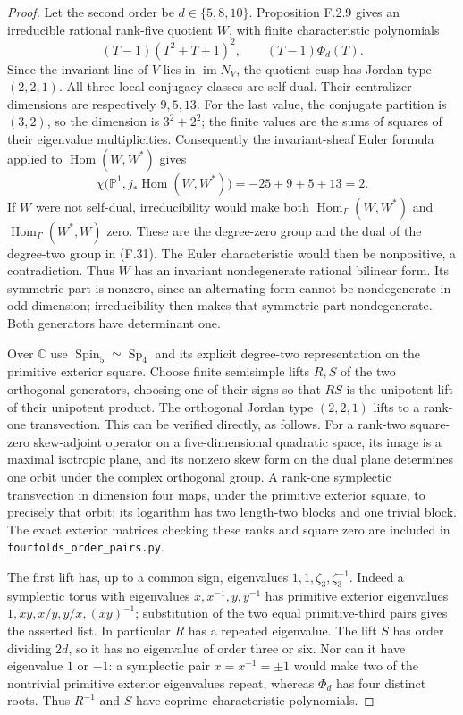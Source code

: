 \begin{proof}
Let the second order be $d\in\{5,8,10\}$.
Proposition F.2.9 gives an irreducible rational rank-five
quotient $W$, with finite characteristic polynomials
\[
 (T-1)(T^2+T+1)^2,
 \qquad (T-1)\Phi_d(T).
\]
Since the invariant line of $V$ lies in $\operatorname{im}N_V$,
the quotient cusp has Jordan type $(2,2,1)$.
All three local conjugacy classes are self-dual.  Their
centralizer dimensions are respectively $9,5,13$.
For the last value, the conjugate partition is $(3,2)$,
so the dimension is $3^2+2^2$; the finite values are the
sums of squares of their eigenvalue multiplicities.
Consequently the invariant-sheaf Euler formula applied to
$\operatorname{Hom}(W,W^*)$ gives
\[
 \chi\bigl(\mathbb P^1,j_*\operatorname{Hom}(W,W^*)\bigr)
      =-25+9+5+13=2.
 \tag{F.31}
\]
If $W$ were not self-dual, irreducibility would make both
$\operatorname{Hom}_\Gamma(W,W^*)$ and
$\operatorname{Hom}_\Gamma(W^*,W)$ zero.  These are the
degree-zero group and the dual of the degree-two group in
(F.31).  The Euler characteristic would then be nonpositive,
a contradiction.  Thus $W$ has an invariant nondegenerate
rational bilinear form.  Its symmetric part is nonzero,
since an alternating form cannot be nondegenerate in odd
dimension; irreducibility then makes that symmetric part
nondegenerate.  Both generators have determinant one.

Over $\mathbb C$ use
$\operatorname{Spin}_5\simeq\operatorname{Sp}_4$ and its
explicit degree-two representation on the primitive exterior
square.  Choose finite semisimple lifts $R,S$ of the two
orthogonal generators, choosing one of their signs so that
$RS$ is the unipotent lift of their unipotent product.
The orthogonal Jordan type $(2,2,1)$ lifts to a rank-one
transvection.  This can be verified directly, as follows.
For a rank-two square-zero skew-adjoint operator on a
five-dimensional quadratic space, its image is a maximal
isotropic plane, and its nonzero skew form on the dual plane
determines one orbit under the complex orthogonal group.
A rank-one symplectic transvection in dimension four maps,
under the primitive exterior square, to precisely that orbit:
its logarithm has two length-two blocks and one trivial block.
The exact exterior matrices checking these ranks and square
zero are included in \texttt{fourfolds\_order\_pairs.py}.

The first lift has, up to a common sign, eigenvalues
$1,1,\zeta_3,\zeta_3^{-1}$.  Indeed a symplectic torus with
eigenvalues $x,x^{-1},y,y^{-1}$ has primitive exterior
eigenvalues $1,xy,x/y,y/x,(xy)^{-1}$; substitution of the
two equal primitive-third pairs gives the asserted list.
In particular $R$ has a repeated eigenvalue.
The lift $S$ has order dividing $2d$, so it has no eigenvalue
of order three or six.  Nor can it have eigenvalue $1$ or
$-1$: a symplectic pair $x=x^{-1}=\pm1$ would make two of
the nontrivial primitive exterior eigenvalues repeat, whereas
$\Phi_d$ has four distinct roots.
Thus $R^{-1}$ and $S$ have coprime characteristic polynomials.


\end{proof}
